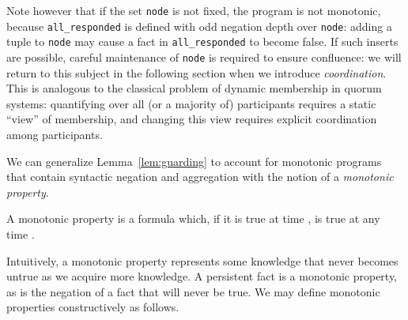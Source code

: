 Note however that if the set \texttt{node} is not fixed, the program is not monotonic, because 
\texttt{all\_responded} is defined with odd negation depth over \texttt{node}: adding a tuple
to \texttt{node} may cause a fact in \texttt{all\_responded} to become false.  If such inserts
are possible, careful maintenance of \texttt{node} is required to ensure confluence: we will
return to this subject in the following section when we introduce {\em coordination}.
This is analogous to the classical problem of dynamic membership in quorum systems: quantifying over all (or a majority
of) participants requires a static ``view'' of membership, and changing this view requires
explicit coordination among participants.



We can generalize Lemma~\ref{lem:guarding} to account for monotonic programs that 
contain syntactic negation  and aggregation with
the notion of a {\em monotonic property}.




\begin{definition}
A monotonic property is a formula which, if it is true at time ,  is true at any time .
\end{definition}

Intuitively, a monotonic property represents some knowledge that never becomes untrue as we acquire  more knowledge.  A persistent fact is a monotonic property, as is the negation of a
fact that will never be true.  We may define monotonic properties constructively as follows. 
  


